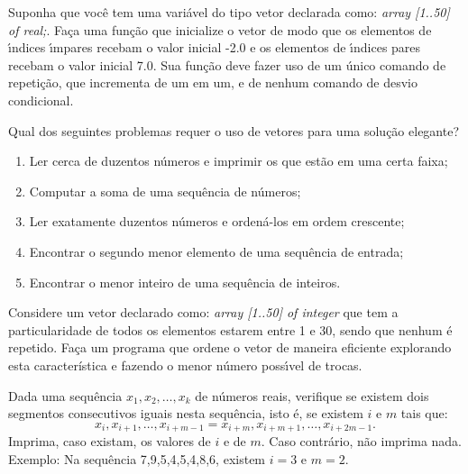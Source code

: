 \item Suponha que voc\^e tem uma vari\'avel do tipo vetor declarada como:
\emph{array [1..50] of real;}. 
Fa\c ca uma fun\c c\~ao 
que inicialize o vetor de modo que os elementos
de \'{\i}ndices \'{\i}mpares recebam o valor inicial -2.0 e os elementos
de \'{\i}ndices pares recebam o valor inicial 7.0. Sua função deve
fazer uso de um único comando de repetição, que incrementa de um em um, e de 
nenhum comando de desvio condicional.

\item Qual dos seguintes problemas requer o uso de vetores para uma solu\c c\~ao elegante?
\begin {enumerate}
\item Ler cerca de duzentos n\'umeros e imprimir os que est\~ao em uma certa faixa;
\item Computar a soma de uma sequ\^encia de n\'umeros;
\item Ler exatamente duzentos n\'umeros e orden\'a-los em ordem crescente;
\item Encontrar o segundo menor elemento de uma sequ\^encia de entrada;
\item Encontrar o menor inteiro de uma sequ\^encia de inteiros.
\end {enumerate}

\item Considere um vetor  declarado como: 
\emph{array [1..50] of integer} que tem a 
particularidade de todos os elementos estarem entre 1 e 30, sendo que
nenhum \'e repetido. Fa\c ca um programa
que ordene o vetor de maneira eficiente explorando esta característica e fazendo
o menor n\'umero poss\'{\i}vel de trocas.

\item   Dada uma sequência $x_1, x_2, \ldots, x_k$ de números
  reais, verifique  se existem dois segmentos  consecutivos iguais nesta
  sequência, isto é, se existem $i$ e $m$ tais que:
\[ x_i, x_{i+1}, \ldots, x_{i+m-1}=x_{i+m}, x_{i+m+1}, \ldots, x_{i+2m-1}.
\]
Imprima, caso existam,  os valores de $i$ e de  $m$. Caso contrário, não
imprima  nada. Exemplo:  Na sequência  7,9,5,4,5,4,8,6, existem  $i=3$ e
$m=2$. 

